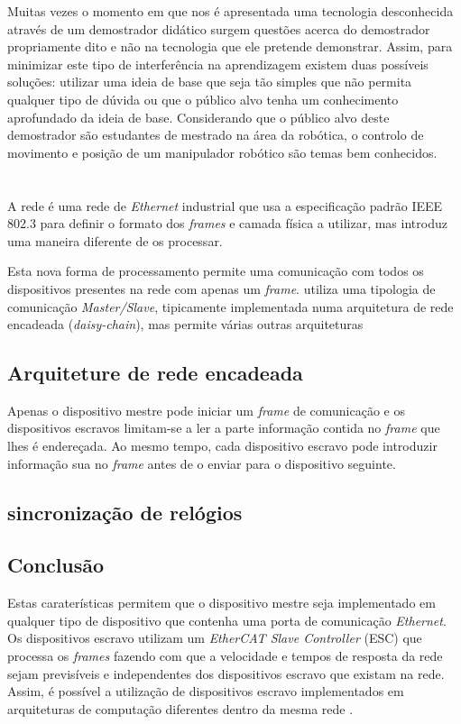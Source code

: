 Muitas vezes o momento em que nos é apresentada uma tecnologia desconhecida
através de um demostrador didático surgem questões acerca do demostrador
propriamente dito e não na tecnologia que ele pretende demonstrar. Assim,
para minimizar este tipo de interferência na aprendizagem existem duas
possíveis soluções: utilizar uma ideia de base que seja tão simples que
não permita qualquer tipo de dúvida ou que o público alvo tenha um
conhecimento aprofundado da ideia de base. Considerando que o público alvo
deste demostrador são estudantes de mestrado na área da robótica,
o controlo de movimento e posição de um manipulador robótico são temas
bem conhecidos.

% 


\section{\ecat}\label{sec:ethercat}

A rede \ecat é uma rede de \emph{Ethernet} industrial que usa a
especificação padrão IEEE 802.3 \cite[]{ieee:IEEEStandardEthernet} para
definir o formato dos \emph{frames} e camada física a utilizar, mas
introduz uma maneira diferente de os processar.

Esta nova forma de processamento permite uma comunicação com todos os
dispositivos presentes na rede com apenas um \emph{frame}. \ecat utiliza
uma tipologia de comunicação \emph{Master/Slave}, tipicamente implementada
numa arquitetura de rede encadeada (\emph{daisy-chain}), mas permite várias
outras arquiteturas %

\subsection{Arquiteture de rede encadeada}
Apenas o dispositivo mestre pode iniciar um \emph{frame} de comunicação
e os dispositivos escravos limitam-se a ler a parte informação contida
no \emph{frame} que lhes é endereçada. Ao mesmo tempo, cada dispositivo
escravo pode introduzir informação sua  no \emph{frame} antes de o enviar
para o dispositivo seguinte.

\subsection{sincronização de relógios}


\subsection{Conclusão}
Estas caraterísticas permitem que o dispositivo mestre seja implementado
em qualquer tipo de dispositivo que contenha uma porta de comunicação 
\emph{Ethernet}. Os dispositivos escravo utilizam um \emph{EtherCAT Slave
Controller} (ESC) que processa os \emph{frames} fazendo com que a velocidade
e tempos de resposta da rede sejam previsíveis e independentes dos 
dispositivos escravo que existam na rede. Assim, é possível a utilização
de dispositivos escravo implementados em arquiteturas de computação
diferentes dentro da mesma rede \ecat.


